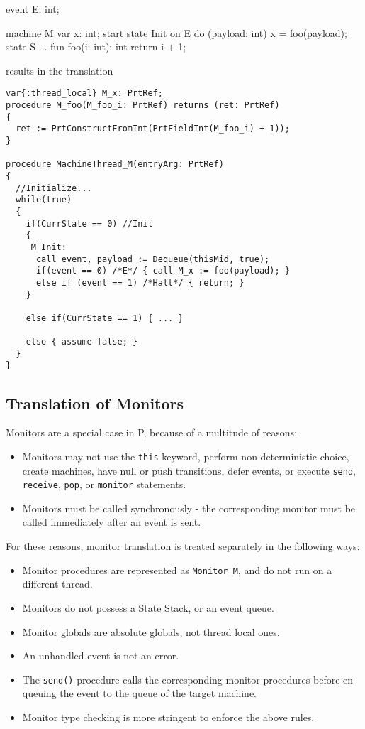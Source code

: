 \documentclass{llncs}
\begin{document}
\begin{psharpNoLines}
event E: int;

machine M {
  var x: int;
  start state Init { 
    on E do (payload: int) { 
      x = foo(payload); 
    } 
  }
  state S { ... }
  fun foo(i: int): int  { 
    return i + 1; 
  }
}
\end{psharpNoLines}

\pagebreak

results in the translation
\begin{verbatim}
var{:thread_local} M_x: PrtRef;
procedure M_foo(M_foo_i: PrtRef) returns (ret: PrtRef)
{
  ret := PrtConstructFromInt(PrtFieldInt(M_foo_i) + 1));
}

procedure MachineThread_M(entryArg: PrtRef)
{
  //Initialize...
  while(true) 
  {
    if(CurrState == 0) //Init 
    {
     M_Init:
      call event, payload := Dequeue(thisMid, true);
      if(event == 0) /*E*/ { call M_x := foo(payload); }
      else if (event == 1) /*Halt*/ { return; }
    }

    else if(CurrState == 1) { ... }

    else { assume false; }
  }
}
\end{verbatim}

\subsection{Translation of Monitors} %
Monitors are a special case in P, because of a multitude of reasons:
\begin{itemize}
\item Monitors may not use the \texttt{this} keyword, perform non-deterministic choice, create machines, have null or push transitions, defer events, or execute \texttt{send}, \texttt{receive}, \texttt{pop}, or  \texttt{monitor} statements.
\item Monitors must be called synchronously - the corresponding monitor must be called immediately after an event is sent.
\end{itemize}
\noindent
For these reasons, monitor translation is treated separately in the following ways:
\begin{itemize}
\item Monitor procedures are represented as \texttt{Monitor\_M\(\)}, and do not run on a different thread.
\item Monitors do not possess a State Stack, or an event queue.
\item Monitor globals are absolute globals, not thread local ones.
\item An unhandled event is not an error.
\item The \texttt{send()} procedure calls the corresponding monitor procedures before en-queuing the event to the queue of the target machine.
\item Monitor type checking is more stringent to enforce the above rules.
\end{itemize}
\end{document}
